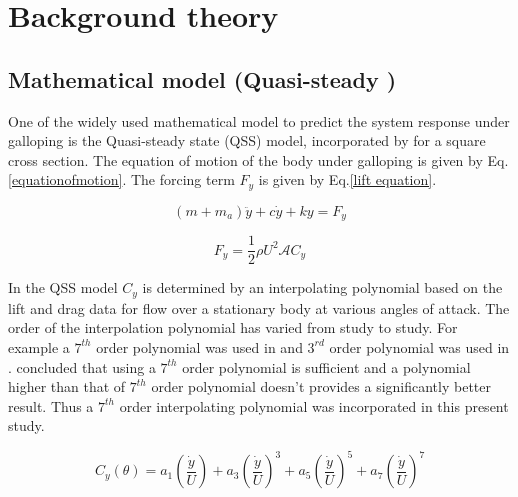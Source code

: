 
\section{Background theory}
\label{sec:theory}

\subsection{Mathematical model (Quasi-steady )}

 One of the widely used mathematical model to predict the system response under galloping is the Quasi-steady state (QSS) model, incorporated by \cite{Parkinson1964} for a square cross section. The equation of motion of the body under galloping is given by Eq.\eqref{equationofmotion}. The forcing term $F_y$ is given by Eq.\eqref{lift equation}.
 
 

\begin{equation}
\label{equationofmotion}
(m+m_a)\ddot{y}+c\dot{y}+ky=F_y
\end{equation}

\begin{equation}
\label{lift equation}
F_y=\frac{1}{2}\rho U^2\mathcal{A}C_y
\end{equation}

 In the QSS  model $C_y$ is determined by an interpolating polynomial based on the lift and drag data  for flow over a stationary body at various angles of attack. The order of the interpolation polynomial has varied from study to study. For  example a $7^{th}$ order polynomial was used in \cite{Parkinson1964} and $3^{rd}$ order polynomial was used in \cite{Barrero-Gil2009}. \cite{Ng2005} concluded that using a $7^{th}$ order polynomial is sufficient and a polynomial higher than that of $7^{th}$ order polynomial doesn't provides a significantly better result. Thus a $7 ^{th}$ order interpolating polynomial was incorporated in this present study. 

\begin{equation}
\label{cy ploynomial}
C_y(\theta)=a_1\left(\frac{\dot{y}}{U}\right)+a_3\left(\frac{\dot{y}}{U}\right)^3+a_5\left(\frac{\dot{y}}{U}\right)^5+a_7\left(\frac{\dot{y}}{U}\right)^7
\end{equation}


